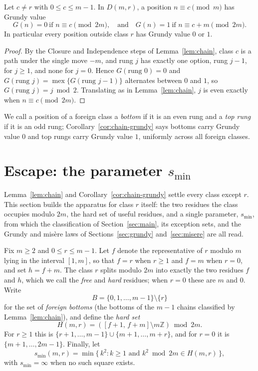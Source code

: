 \begin{corollary}\label{cor:chain-grundy}
Let $c \ne r$ with $0 \le c \le m-1$. In $D(m,r)$, a position
$n \equiv c \pmod m$ has Grundy value
\[
G(n) = 0 \ \text{if } n \equiv c \pmod{2m}, \quad\text{and}\quad
G(n) = 1 \ \text{if } n \equiv c + m \pmod{2m}.
\]
In particular every position outside class $r$ has Grundy value $0$ or
$1$.
\end{corollary}
\begin{proof}
By the Closure and Independence steps of Lemma~\ref{lem:chain}, class $c$
is a path under the single move $-m$, and rung $j$ has exactly one
option, rung $j-1$, for $j \ge 1$, and none for $j = 0$. Hence
$G(\text{rung } 0) = 0$ and
$G(\text{rung } j) = \operatorname{mex}\{G(\text{rung } j-1)\}$
alternates between $0$ and $1$, so $G(\text{rung } j) = j \bmod 2$.
Translating as in Lemma~\ref{lem:chain}, $j$ is even exactly when
$n \equiv c \pmod{2m}$.
\end{proof}

We call a position of a foreign class a \emph{bottom} if it is an even
rung and a \emph{top rung} if it is an odd rung;
Corollary~\ref{cor:chain-grundy} says bottoms carry Grundy value $0$ and
top rungs carry Grundy value $1$, uniformly across all foreign classes.

\section{Escape: the parameter $s_{\min}$}\label{sec:clearing}

Lemma~\ref{lem:chain} and Corollary~\ref{cor:chain-grundy} settle every
class except $r$. This section builds the apparatus for class $r$
itself: the two residues the class occupies modulo $2m$, the hard set of
useful residues, and a single parameter, $s_{\min}$, from which the
classification of Section~\ref{sec:main}, its exception sets, and the
Grundy and mis\`ere laws of Sections~\ref{sec:grundy}
and~\ref{sec:misere} are all read.

\begin{definition}
\label{def:smin}
Fix $m \ge 2$ and $0 \le r \le m-1$. Let $f$ denote the representative of
$r$ modulo $m$ lying in the interval $[1, m]$, so that $f = r$ when
$r \ge 1$ and $f = m$ when $r = 0$, and set $h = f + m$. The class $r$
splits modulo $2m$ into exactly the two residues $f$ and $h$, which we
call the \emph{free} and \emph{hard} residues; when $r = 0$ these are $m$
and $0$. Write
\[ B = \{0, 1, \dots, m-1\} \setminus \{r\} \]
for the set of \emph{foreign bottoms} (the bottoms of the $m-1$ chains
classified by Lemma~\ref{lem:chain}), and define the \emph{hard set}
\[ H(m,r) = ([f+1,\, f+m] \setminus m\mathbb{Z}) \bmod 2m. \]
For $r \ge 1$ this is $\{r+1, \dots, m-1\} \cup \{m+1, \dots, m+r\}$, and
for $r = 0$ it is $\{m+1, \dots, 2m-1\}$. Finally, let
\[ s_{\min}(m,r) = \min\{\, k^2 : k \ge 1 \text{ and } k^2 \bmod 2m \in H(m,r) \,\}, \]
with $s_{\min} = \infty$ when no such square exists.
\end{definition}

